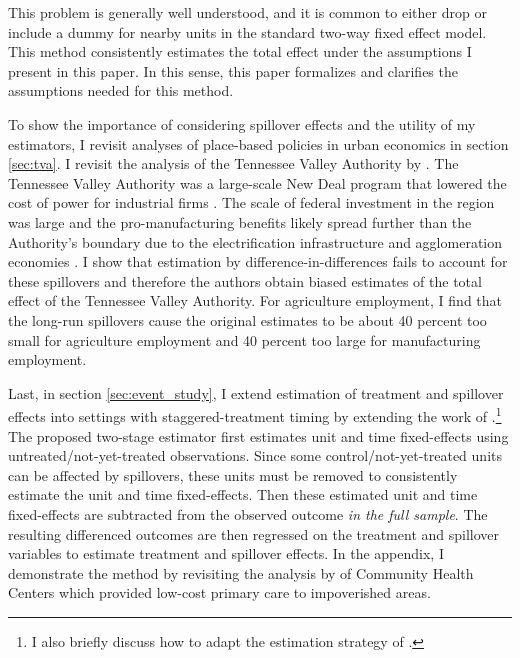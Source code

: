 This problem is generally well understood, and it is common to either drop or include a dummy for nearby units in the standard two-way fixed effect model. This method consistently estimates the total effect under the assumptions I present in this paper. In this sense, this paper formalizes and clarifies the assumptions needed for this method. 

To show the importance of considering spillover effects and the utility of my estimators, I revisit analyses of place-based policies in urban economics in section \ref{sec:tva}. I revisit the analysis of the Tennessee Valley Authority by \citet{Kline_Moretti_2014a}. The Tennessee Valley Authority was a large-scale New Deal program that lowered the cost of power for industrial firms \citep{Kitchens_2014}. The scale of federal investment in the region was large and the pro-manufacturing benefits likely spread further than the Authority's boundary due to the electrification infrastructure and agglomeration economies \citep{severnini2023power}. I show that estimation by difference-in-differences fails to account for these spillovers and therefore the authors obtain biased estimates of the total effect of the Tennessee Valley Authority. For agriculture employment, I find that the long-run spillovers cause the original estimates to be about 40 percent too small for agriculture employment and 40 percent too large for manufacturing employment. 

Last, in section \ref{sec:event_study}, I extend estimation of treatment and spillover effects into settings with staggered-treatment timing by extending the work of \citet{Gardner_2021,Borusyak_Jaravel_Spiess_2021}.\footnote{I also briefly discuss how to adapt the estimation strategy of \citep{Callaway_SantAnna_2020}.} The proposed two-stage estimator first estimates unit and time fixed-effects using untreated/not-yet-treated observations. Since some control/not-yet-treated units can be affected by spillovers, these units must be removed to consistently estimate the unit and time fixed-effects. Then these estimated unit and time fixed-effects are subtracted from the observed outcome \textit{in the full sample}. The resulting differenced outcomes are then regressed on the treatment and spillover variables to estimate treatment and spillover effects. In the appendix, I demonstrate the method by revisiting the analysis by \citet{Bailey_Goodman_Bacon_2015} of Community Health Centers which provided low-cost primary care to impoverished areas.

